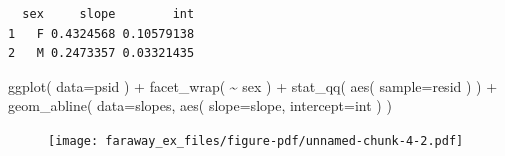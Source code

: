 \documentclass[
  letterpaper,
  DIV=11,
  numbers=noendperiod]{scrreprt}
\newenvironment{Shaded}{\begin{snugshade}}{\end{snugshade}}
\newcommand{\AttributeTok}[1]{\textcolor[rgb]{0.49,0.56,0.16}{#1}}
\newcommand{\CommentTok}[1]{\textcolor[rgb]{0.38,0.63,0.69}{\textit{#1}}}
\newcommand{\ControlFlowTok}[1]{\textcolor[rgb]{0.00,0.44,0.13}{\textbf{#1}}}
\newcommand{\DecValTok}[1]{\textcolor[rgb]{0.25,0.63,0.44}{#1}}
\newcommand{\FloatTok}[1]{\textcolor[rgb]{0.25,0.63,0.44}{#1}}
\newcommand{\FunctionTok}[1]{\textcolor[rgb]{0.02,0.16,0.49}{#1}}
\newcommand{\NormalTok}[1]{\textcolor[rgb]{0.00,0.44,0.13}{#1}}
\newcommand{\OtherTok}[1]{\textcolor[rgb]{0.00,0.44,0.13}{#1}}
\newcommand{\SpecialCharTok}[1]{\textcolor[rgb]{0.25,0.44,0.63}{#1}}
\begin{document}
\begin{Shaded}
\end{Shaded}

\begin{verbatim}
  sex     slope        int
1   F 0.4324568 0.10579138
2   M 0.2473357 0.03321435
\end{verbatim}

\begin{Shaded}
\begin{Highlighting}[]
\FunctionTok{ggplot}\NormalTok{( }\AttributeTok{data=}\NormalTok{psid ) }\SpecialCharTok{+}
    \FunctionTok{facet\_wrap}\NormalTok{( }\SpecialCharTok{\textasciitilde{}}\NormalTok{ sex ) }\SpecialCharTok{+}
    \FunctionTok{stat\_qq}\NormalTok{( }\FunctionTok{aes}\NormalTok{( }\AttributeTok{sample=}\NormalTok{resid ) ) }\SpecialCharTok{+}
    \FunctionTok{geom\_abline}\NormalTok{( }\AttributeTok{data=}\NormalTok{slopes, }\FunctionTok{aes}\NormalTok{( }\AttributeTok{slope=}\NormalTok{slope, }\AttributeTok{intercept=}\NormalTok{int ) )}
\end{Highlighting}
\end{Shaded}

\begin{figure}[H]

{\centering \texttt{[image: faraway\_ex\_files/figure-pdf/unnamed-chunk-4-2.pdf]}

}

\end{figure}
\end{document}
